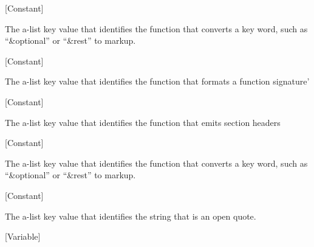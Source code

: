 \vspace{1em}
\noindent
{}
\usebox{\funcname}
 \hfill [Constant]

\begin{doc-string}
The a-list key value that identifies the function that converts a key word, such
as ``\&optional'' or ``\&rest'' to markup.
\end{doc-string}

\vspace{1em}
\noindent
{}
\usebox{\funcname}
 \hfill [Constant]

\begin{doc-string}
The a-list key value that identifies the function that formats a function signature'
\end{doc-string}

\vspace{1em}
\noindent
{}
\usebox{\funcname}
 \hfill [Constant]

\begin{doc-string}
The a-list key value that identifies the function that emits section headers
\end{doc-string}

\vspace{1em}
\noindent
{}
\usebox{\funcname}
 \hfill [Constant]

\begin{doc-string}
The a-list key value that identifies the function that converts a key word, such
as ``\&optional'' or ``\&rest'' to markup.
\end{doc-string}

\vspace{1em}
\noindent
{}
\usebox{\funcname}
 \hfill [Constant]

\begin{doc-string}
The a-list key value that identifies the string that is an open quote.
\end{doc-string}

\vspace{1em}
\noindent
{}
\usebox{\funcname}
 \hfill [Variable]

